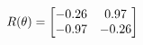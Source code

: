 \documentclass[preview]{standalone}
\begin{document}
\begin{align*}
\special{dvisvgm:raw <g id='unique000'>}R(\theta) = \begin{bmatrix}-0.26 & 0.97\\-0.97 & -0.26\end{bmatrix}\special{dvisvgm:raw </g>}
\end{align*}
\end{document}
